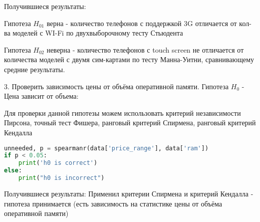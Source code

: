 \documentclass{article}
\begin{document}
Получившиеся результаты:

Гипотеза $H_{01}$ верна - количество телефонов с поддержкой 3G отличается от кол-ва моделей с WI-Fi по двухвыборочному тесту Стьюдента

Гипотеза $H_{02}$ неверна - количество телефонов с touch screen не отличается от количества моделей с двумя сим-картами по тесту Манна-Уитни, сравнивающему средние результаты.

3. Проверить зависимость цены от объёма оперативной памяти. Гипотеза $H_0$ - Цена зависит от объема:

Для проверки данной гипотезы можем использовать критерий независимости Пирсона, точный тест Фишера, ранговый критерий Спирмена, ранговый критерий Кендалла

\begin{lstlisting}[language=Python, mathescape=true, breaklines=true]
unneeded, p = spearmanr(data['price_range'], data['ram'])
if p < 0.05:
    print('h0 is correct')
else:
    print("h0 is incorrect")
\end{lstlisting}   

Получившиеся результаты:
Применил критерии Спирмена и критерий Кендалла - гипотеза принимается (есть зависимость на статистике цены от объёма оперативной памяти)
\end{document}
